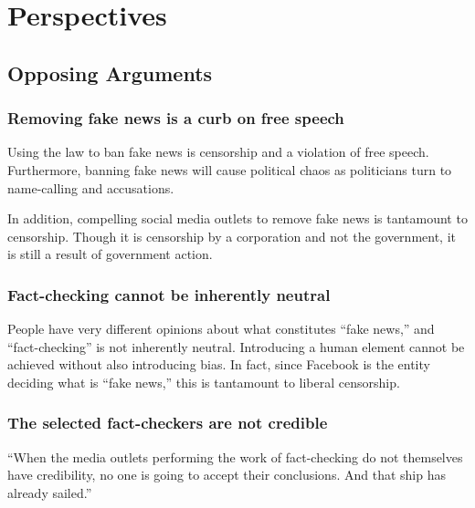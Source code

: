 
\section{Perspectives}
\label{perspectives}

\subsection{Opposing Arguments}

\subsubsection{Removing fake news is a curb on free speech}

\par Using the law to ban fake news is censorship and a violation of free speech. Furthermore, banning fake news will cause political chaos as politicians turn to name-calling and accusations. \cite{eff_bill}
\par In addition, compelling social media outlets to remove fake news is tantamount to censorship. Though it is censorship by a corporation and not the government, it is still a result of government action. \cite{wp_germany}

\subsubsection{Fact-checking cannot be inherently neutral}

\par People have very different opinions about what constitute{}s ``fake news,'' and ``fact-checking'' is not inherently neutral. Introducing a human element cannot be achieved without also introducing bias. \cite{vox_sentences} In fact, since Facebook is the entity deciding what is ``fake news,'' this is tantamount to liberal censorship. \cite{milo_censor}

\subsubsection{The selected fact-checkers are not credible}

\par ``When the media outlets performing the work of fact-checking do not themselves have credibility, no one is going to accept their conclusions. And that ship has already sailed.'' \cite{vox_sentences}

